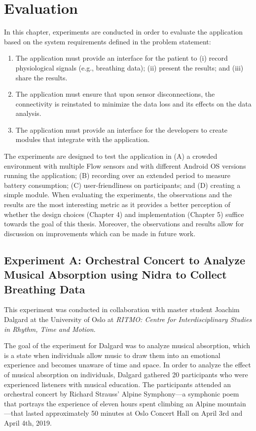 \chapter{Evaluation}

In this chapter, experiments are conducted in order to evaluate the application based on the system requirements defined in the problem statement: 

\begin{enumerate}
    \item The application must provide an interface for the patient to (i) record physiological signals (e.g., breathing data); (ii) present the results; and (iii) share the results.
    \item The application must ensure that upon sensor disconnections, the connectivity is reinstated to minimize the data loss and its effects on the data analysis.
    \item The application must provide an interface for the developers to create modules that integrate with the application.
\end{enumerate}

The experiments are designed to test the application in (A) a crowded environment with multiple Flow sensors and with different Android OS versions running the application; (B) recording over an extended period to measure battery consumption; (C) user-friendliness on participants; and (D) creating a simple module. When evaluating the experiments, the observations and the results are the most interesting metric as it provides a better perception of whether the design choices (Chapter 4) and implementation (Chapter 5) suffice towards the goal of this thesis. Moreover, the observations and results allow for discussion on improvements which can be made in future work.  

\newpage
\section{Experiment A: Orchestral Concert to Analyze Musical Absorption using Nidra to Collect Breathing Data}
This experiment was conducted in collaboration with master student Joachim Dalgard at the University of Oslo at \textit{RITMO: Centre for Interdisciplinary Studies in Rhythm, Time and Motion}. 

The goal of the experiment for Dalgard was to analyze musical absorption, which is a state when individuals allow music to draw them into an emotional experience and becomes unaware of time and space. In order to analyze the effect of musical absorption on individuals, Dalgard gathered 20 participants who were experienced listeners with musical education. The participants attended an orchestral concert by Richard Strauss' Alpine Symphony---a symphonic poem that portrays the experience of eleven hours spent climbing an Alpine mountain---that lasted approximately 50 minutes at Oslo Concert Hall on April 3rd and April 4th, 2019.  


